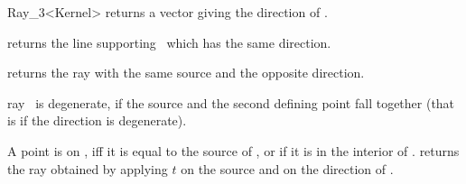 \begin{ccRefClass} {Ray_3<Kernel>}
       {returns a vector giving the direction of \ccVar.}

       {returns the line supporting \ccVar\ which has the same direction.}

       {returns the ray with the same source and the opposite direction.}

       {ray \ccVar\ is degenerate, if the source and the second defining
        point fall together (that is if the direction is degenerate).}


       {A point is on \ccVar, iff it is equal to the source 
        of \ccVar, or if it is in the interior of \ccVar.}
% 
% 
       {returns the ray obtained by applying $t$ on the source 
        and on the direction of \ccVar.}

\ccSeeAlso
{}

\end{ccRefClass} 
